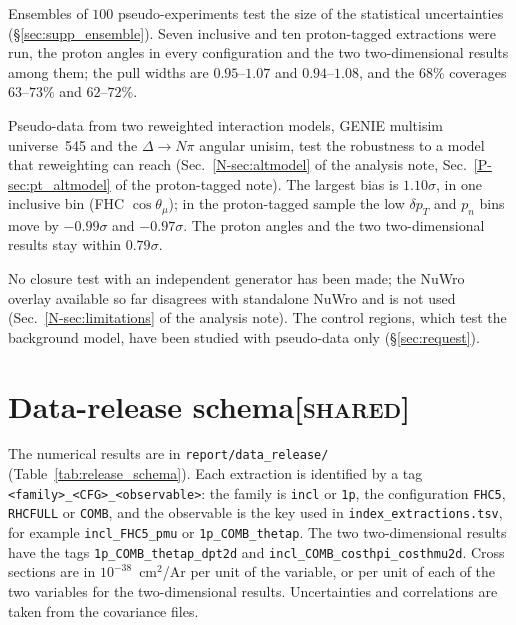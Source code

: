 \documentclass[11pt,a4paper]{article}
\newcommand{\ptref}[2]{#1~\ref{P-#2} of the proton-tagged note}
\newcommand{\noteref}[2]{#1~\ref{N-#2} of the analysis note}
\newcommand{\scopetag}[1]{\hfill{\normalfont\small\textsc{[#1]}}}
\begin{document}
Ensembles of $100$ pseudo-experiments test the size of the statistical uncertainties
(\S\ref{sec:supp_ensemble}). Seven inclusive and ten proton-tagged extractions were run, the proton
angles in every configuration and the two two-dimensional results among them; the pull widths are
$0.95$--$1.07$ and $0.94$--$1.08$, and the $68\%$ coverages $63$--$73\%$ and $62$--$72\%$.

Pseudo-data from two reweighted interaction models, GENIE multisim universe~545 and the
$\Delta\to N\pi$ angular unisim, test the robustness to a model that reweighting can reach
(\noteref{Sec.}{sec:altmodel}, \ptref{Sec.}{sec:pt_altmodel}). The largest bias is $1.10\sigma$, in one
inclusive bin (FHC $\cos\theta_\mu$); in the proton-tagged sample the low $\delta p_T$ and $p_n$
bins move by $-0.99\sigma$ and $-0.97\sigma$. The proton angles and the two two-dimensional results stay
within $0.79\sigma$.

No closure test with an independent generator has been made; the NuWro overlay available so far
disagrees with standalone NuWro and is not used (\noteref{Sec.}{sec:limitations}). The control regions,
which test the background model, have been studied with pseudo-data only (\S\ref{sec:request}).

\section[Data-release schema]{Data-release schema\scopetag{shared}}
\label{sec:release_schema}

The numerical results are in \texttt{report/data\_release/} (Table~\ref{tab:release_schema}). Each
extraction is identified by a tag \texttt{<family>\_<CFG>\_<observable>}: the family is \texttt{incl}
or \texttt{1p}, the configuration \texttt{FHC5}, \texttt{RHCFULL} or \texttt{COMB}, and the observable
is the key used in \texttt{index\_extractions.tsv}, for example \texttt{incl\_FHC5\_pmu} or
\texttt{1p\_COMB\_thetap}. The two two-dimensional results have the tags
\texttt{1p\_COMB\_thetap\_dpt2d} and \texttt{incl\_COMB\_costhpi\_costhmu2d}. Cross sections are in
$10^{-38}$~cm$^2$/Ar per unit of the variable, or per unit of each of the two variables for the
two-dimensional results. Uncertainties and correlations are taken from the covariance files.
\end{document}
